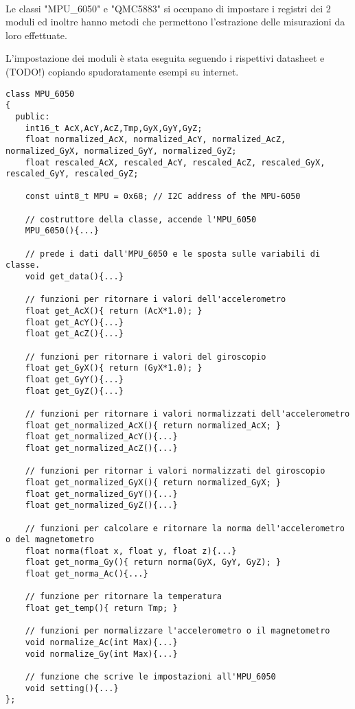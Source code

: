 \documentclass[10pt,a4paper]{article}
\begin{document}
\\

Le classi "MPU\_6050" e "QMC5883" si occupano di impostare i registri dei 2 moduli ed inoltre hanno metodi che permettono l'estrazione delle misurazioni da loro effettuate. 

L'impostazione dei moduli \`e stata eseguita seguendo i rispettivi datasheet e (TODO!) copiando spudoratamente esempi su internet. 
\begin{lstlisting}[style=myArduino, caption=classe "MPU\_6050", captionpos=b]
class MPU_6050
{
  public:
    int16_t AcX,AcY,AcZ,Tmp,GyX,GyY,GyZ;
    float normalized_AcX, normalized_AcY, normalized_AcZ, normalized_GyX, normalized_GyY, normalized_GyZ;
    float rescaled_AcX, rescaled_AcY, rescaled_AcZ, rescaled_GyX, rescaled_GyY, rescaled_GyZ;
  
    const uint8_t MPU = 0x68; // I2C address of the MPU-6050
    
    // costruttore della classe, accende l'MPU_6050
    MPU_6050(){...}
  
    // prede i dati dall'MPU_6050 e le sposta sulle variabili di classe.
    void get_data(){...}
  
    // funzioni per ritornare i valori dell'accelerometro
    float get_AcX(){ return (AcX*1.0); }
    float get_AcY(){...}
    float get_AcZ(){...}
  
    // funzioni per ritornare i valori del giroscopio
    float get_GyX(){ return (GyX*1.0); }
    float get_GyY(){...}
    float get_GyZ(){...}
    
    // funzioni per ritornare i valori normalizzati dell'accelerometro
    float get_normalized_AcX(){ return normalized_AcX; }
    float get_normalized_AcY(){...}
    float get_normalized_AcZ(){...}
  
    // funzioni per ritornar i valori normalizzati del giroscopio
    float get_normalized_GyX(){ return normalized_GyX; }
    float get_normalized_GyY(){...}
    float get_normalized_GyZ(){...}
  
    // funzioni per calcolare e ritornare la norma dell'accelerometro o del magnetometro
    float norma(float x, float y, float z){...}
    float get_norma_Gy(){ return norma(GyX, GyY, GyZ); }
    float get_norma_Ac(){...}
  
    // funzione per ritornare la temperatura
    float get_temp(){ return Tmp; }
  
    // funzioni per normalizzare l'accelerometro o il magnetometro
    void normalize_Ac(int Max){...}
    void normalize_Gy(int Max){...}
    
    // funzione che scrive le impostazioni all'MPU_6050
    void setting(){...}
};
\end{lstlisting}
\end{document}
